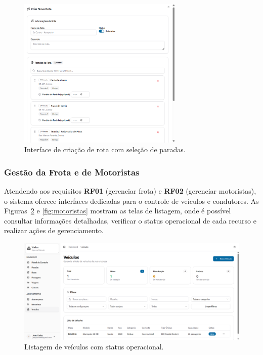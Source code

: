 \begin{figure}[H]
 \centering
 \includegraphics[width=0.7\textwidth]{imagens/criacao-rota.png}
 \caption{Interface de criação de rota com seleção de paradas.}
 \label{fig:criacao-rota}
\end{figure}

\subsubsection{Gestão da Frota e de Motoristas}
Atendendo aos requisitos \textbf{RF01} (gerenciar frota) e \textbf{RF02} (gerenciar motoristas), o sistema oferece interfaces dedicadas para o controle de veículos e condutores. As Figuras~\ref{fig:veiculos} e \ref{fig:motoristas} mostram as telas de listagem, onde é possível consultar informações detalhadas, verificar o status operacional de cada recurso e realizar ações de gerenciamento.

\begin{figure}[H]
 \centering
 \includegraphics[width=1\textwidth]{imagens/veiculos.png}
 \caption{Listagem de veículos com status operacional.}
 \label{fig:veiculos}
\end{figure}

